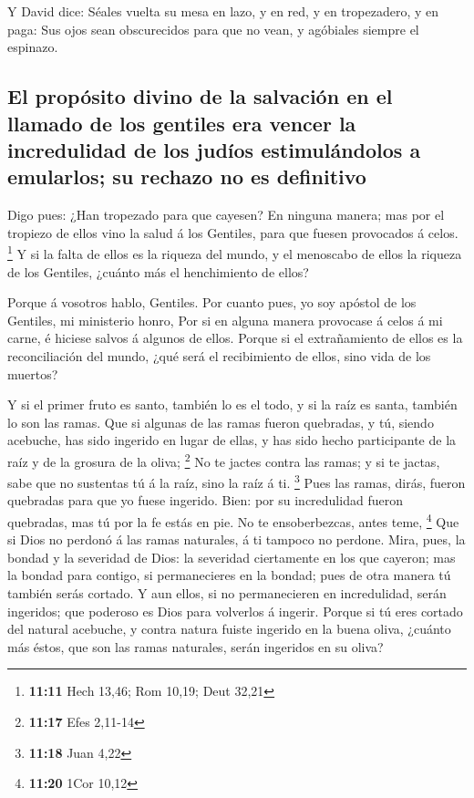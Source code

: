  Y David dice: Séales vuelta su mesa en lazo, y en red, y en
tropezadero, y en paga:  Sus ojos sean obscurecidos para
que no vean, y agóbiales siempre el espinazo.

\hypertarget{el-propuxf3sito-divino-de-la-salvaciuxf3n-en-el-llamado-de-los-gentiles-era-vencer-la-incredulidad-de-los-juduxedos-estimuluxe1ndolos-a-emularlos-su-rechazo-no-es-definitivo}{%
\subsection{El propósito divino de la salvación en el llamado de los
gentiles era vencer la incredulidad de los judíos estimulándolos a
emularlos; su rechazo no es
definitivo}\label{el-propuxf3sito-divino-de-la-salvaciuxf3n-en-el-llamado-de-los-gentiles-era-vencer-la-incredulidad-de-los-juduxedos-estimuluxe1ndolos-a-emularlos-su-rechazo-no-es-definitivo}}

 Digo pues: ¿Han tropezado para que cayesen? En ninguna
manera; mas por el tropiezo de ellos vino la salud á los Gentiles, para
que fuesen provocados á celos. \footnote{\textbf{11:11} Hech 13,46; Rom
  10,19; Deut 32,21}  Y si la falta de ellos es la riqueza
del mundo, y el menoscabo de ellos la riqueza de los Gentiles, ¿cuánto
más el henchimiento de ellos?

 Porque á vosotros hablo, Gentiles. Por cuanto pues, yo soy
apóstol de los Gentiles, mi ministerio honro,  Por si en
alguna manera provocase á celos á mi carne, é hiciese salvos á algunos
de ellos.  Porque si el extrañamiento de ellos es la
reconciliación del mundo, ¿qué será el recibimiento de ellos, sino vida
de los muertos?

 Y si el primer fruto es santo, también lo es el todo, y si
la raíz es santa, también lo son las ramas.  Que si algunas
de las ramas fueron quebradas, y tú, siendo acebuche, has sido ingerido
en lugar de ellas, y has sido hecho participante de la raíz y de la
grosura de la oliva; \footnote{\textbf{11:17} Efes 2,11-14}
 No te jactes contra las ramas; y si te jactas, sabe que no
sustentas tú á la raíz, sino la raíz á ti. \footnote{\textbf{11:18} Juan
  4,22}  Pues las ramas, dirás, fueron quebradas para que
yo fuese ingerido.  Bien: por su incredulidad fueron
quebradas, mas tú por la fe estás en pie. No te ensoberbezcas, antes
teme, \footnote{\textbf{11:20} 1Cor 10,12}  Que si Dios no
perdonó á las ramas naturales, á ti tampoco no perdone. 
Mira, pues, la bondad y la severidad de Dios: la severidad ciertamente
en los que cayeron; mas la bondad para contigo, si permanecieres en la
bondad; pues de otra manera tú también serás cortado.  Y
aun ellos, si no permanecieren en incredulidad, serán ingeridos; que
poderoso es Dios para volverlos á ingerir.  Porque si tú
eres cortado del natural acebuche, y contra natura fuiste ingerido en la
buena oliva, ¿cuánto más éstos, que son las ramas naturales, serán
ingeridos en su oliva?


